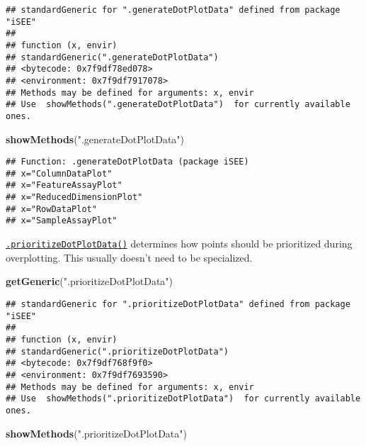 \documentclass[
]{book}
\newenvironment{Shaded}{\begin{snugshade}}{\end{snugshade}}
\newcommand{\KeywordTok}[1]{\textcolor[rgb]{0.13,0.29,0.53}{\textbf{#1}}}
\newcommand{\NormalTok}[1]{#1}
\newcommand{\StringTok}[1]{\textcolor[rgb]{0.31,0.60,0.02}{#1}}
\begin{document}
\begin{verbatim}
## standardGeneric for ".generateDotPlotData" defined from package "iSEE"
## 
## function (x, envir) 
## standardGeneric(".generateDotPlotData")
## <bytecode: 0x7f9df78ed078>
## <environment: 0x7f9df7917078>
## Methods may be defined for arguments: x, envir
## Use  showMethods(".generateDotPlotData")  for currently available ones.
\end{verbatim}

\begin{Shaded}
\begin{Highlighting}[]
\KeywordTok{showMethods}\NormalTok{(}\StringTok{".generateDotPlotData"}\NormalTok{)}
\end{Highlighting}
\end{Shaded}

\begin{verbatim}
## Function: .generateDotPlotData (package iSEE)
## x="ColumnDataPlot"
## x="FeatureAssayPlot"
## x="ReducedDimensionPlot"
## x="RowDataPlot"
## x="SampleAssayPlot"
\end{verbatim}

\href{https://isee.github.io/iSEE/reference/plot-generics.html}{\texttt{.prioritizeDotPlotData()}} determines how points should be prioritized during overplotting.
This usually doesn't need to be specialized.

\begin{Shaded}
\begin{Highlighting}[]
\KeywordTok{getGeneric}\NormalTok{(}\StringTok{".prioritizeDotPlotData"}\NormalTok{)}
\end{Highlighting}
\end{Shaded}

\begin{verbatim}
## standardGeneric for ".prioritizeDotPlotData" defined from package "iSEE"
## 
## function (x, envir) 
## standardGeneric(".prioritizeDotPlotData")
## <bytecode: 0x7f9df768f9f0>
## <environment: 0x7f9df7693590>
## Methods may be defined for arguments: x, envir
## Use  showMethods(".prioritizeDotPlotData")  for currently available ones.
\end{verbatim}

\begin{Shaded}
\begin{Highlighting}[]
\KeywordTok{showMethods}\NormalTok{(}\StringTok{".prioritizeDotPlotData"}\NormalTok{)}
\end{Highlighting}
\end{Shaded}
\end{document}
